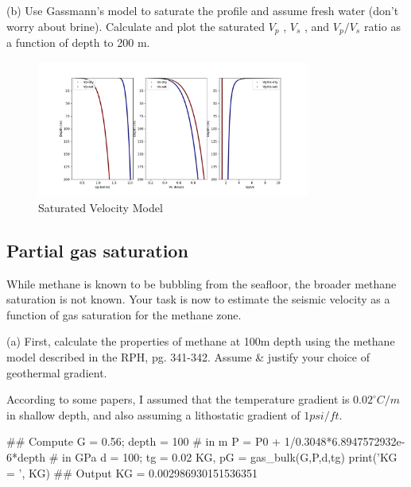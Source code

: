 \begin{problem}{(b)}
    Use Gassmann’s model to saturate the profile and assume fresh water (don’t worry about brine). Calculate and plot the saturated $V_p$ , $V_s$ , and $V_p/V_s$ ratio as a function of depth to 200 m.
\end{problem}
\begin{solution}
        \begin{figure}[h]
        \centering
        \includegraphics[width=0.8\textwidth]{figures/homework-2/p1-1-b.pdf}
        \caption{Saturated Velocity Model}
        \label{fig:p1-1-b}
    \end{figure}
\end{solution}

\subsection{Partial gas saturation}
While methane is known to be bubbling from the seafloor, the broader methane saturation is not known. Your task is now to estimate the seismic velocity as a function of gas saturation for the methane zone.

\begin{problem}{(a)}
    First, calculate the properties of methane at 100m depth using the methane model described in the RPH, pg. 341-342. Assume \& justify your choice of geothermal gradient.
\end{problem}
\begin{solution}
    According to some papers, I assumed that the temperature gradient is $0.02^{\circ}C/m$ in shallow depth,
    and also assuming a lithostatic gradient of $1 psi/ft$.
\begin{pythoncode}
## Compute
G = 0.56; depth = 100  # in m
P = P0 + 1/0.3048*6.8947572932e-6*depth # in GPa 
d = 100; tg = 0.02
KG, pG = gas_bulk(G,P,d,tg)
print('KG = ', KG)
## Output
KG =  0.002986930151536351
\end{pythoncode}
\end{solution}



